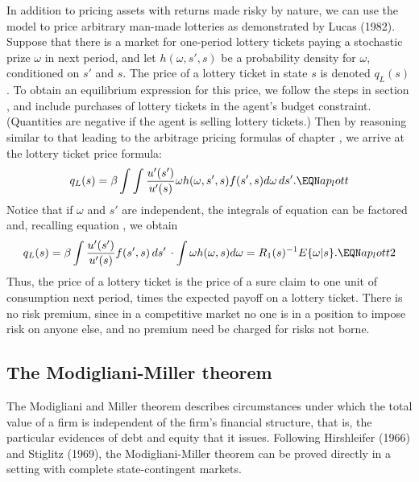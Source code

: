 In addition to pricing assets with returns made risky by nature, we can use
the model to price arbitrary man-made lotteries as demonstrated
by Lucas (1982). %
Suppose that there is a
market for one-period lottery tickets paying a stochastic prize $\omega$ in next
period, and let $h(\omega,s',s)$ be a probability density for $\omega$, conditioned on
$s'$ and $s$. %
The price of a lottery ticket in state $s$ is denoted $q_L(s)$.
To obtain an equilibrium expression for this price,
we follow the steps in section ,
and include purchases of lottery tickets
in the agent's budget constraint. (Quantities are negative if the agent is
selling lottery tickets.) Then by reasoning similar to that leading to
the arbitrage pricing formulas of
chapter , we arrive at the lottery ticket price formula:
$$q_L(s) =\be \int \int {u'(s')\over u'(s)} \omega h(\omega,s',s)
                                        f(s',s)d\omega \, ds'.         \EQN ap_lott
$$
Notice that if $\omega$ and $s'$ are independent, the integrals
of equation  can be factored and, recalling equation
 , we obtain
$$q_L(s) = \be \int {u'(s')\over u'(s)} f(s',s)\, ds'
            \,\cdot \int \omega h(\omega, s) d\omega
         = R_1(s)^{-1} E\{ \omega | s\}.                               \EQN ap_lott2
$$
Thus, the price of a lottery ticket is the price of a sure claim to one
unit of consumption next period, times the expected payoff on a lottery
ticket. There is no risk premium, since in a competitive market no one is
in a position to impose risk on anyone else, and no premium need be
charged for risks not borne.

\subsection{The Modigliani-Miller theorem}

  The Modigliani and Miller theorem %
describes circumstances under which the total value  of
a firm is independent of the firm's  financial structure, that is,
the particular evidences of debt and equity that it issues.
Following Hirshleifer (1966) and Stiglitz (1969), the Modigliani-Miller
theorem can be proved directly in a setting with complete state-contingent
markets.

